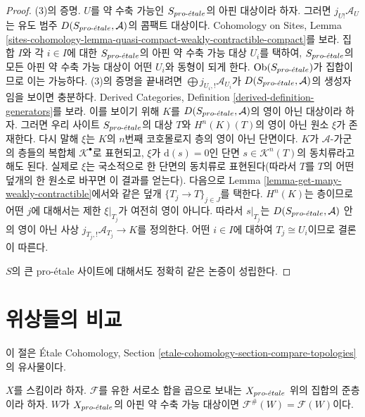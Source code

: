 \begin{proof}
(3)의 증명. $U$를 약 수축 가능인 $S_{pro\text{-}\acute{e}tale}$의 아핀 대상이라 하자.
그러면 $j_{U!}\mathcal{A}_U$는 유도 범주
$D(S_{pro\text{-}\acute{e}tale}, \mathcal{A})$의 콤팩트 대상이다. Cohomology on Sites,
Lemma
\ref{sites-cohomology-lemma-quasi-compact-weakly-contractible-compact}를
보라. 집합 $I$와 각 $i \in I$에 대한 $S_{pro\text{-}\acute{e}tale}$의 아핀 약 수축
가능 대상 $U_i$를 택하여, $S_{pro\text{-}\acute{e}tale}$의 모든 아핀 약 수축 가능
대상이 어떤 $U_i$와 동형이 되게 한다. $\mathop{\mathrm{Ob}}\nolimits(S_{pro\text{-}\acute{e}tale})$가 집합이므로
이는 가능하다. (3)의 증명을 끝내려면
$\bigoplus j_{U_i, !}\mathcal{A}_{U_i}$가
$D(S_{pro\text{-}\acute{e}tale}, \mathcal{A})$의 생성자임을 보이면 충분하다.
Derived Categories, Definition \ref{derived-definition-generators}를 보라.
이를 보이기 위해 $K$를 $D(S_{pro\text{-}\acute{e}tale}, \mathcal{A})$의 영이 아닌
대상이라 하자. 그러면 우리 사이트 $S_{pro\text{-}\acute{e}tale}$의 대상 $T$와
$H^n(K)(T)$의 영이 아닌 원소 $\xi$가 존재한다. 다시 말해 $\xi$는
$K$의 $n$번째 코호몰로지 층의 영이 아닌 단면이다.
$K$가 $\mathcal{A}$-가군의 층들의 복합체 $\mathcal{K}^\bullet$로
표현되고, $\xi$가 $\text{d}(s) = 0$인 단면
$s \in \mathcal{K}^n(T)$의 동치류라고 해도 된다. 실제로 $\xi$는
국소적으로 한 단면의 동치류로 표현된다(따라서 $T$를 $T$의 어떤
덮개의 한 원소로 바꾸면 이 결과를 얻는다).
다음으로 Lemma \ref{lemma-get-many-weakly-contractible}에서와 같은
덮개 $\{T_j \to T\}_{j \in J}$를 택한다. $H^n(K)$는 층이므로 어떤
$j$에 대해서는 제한 $\xi|_{T_j}$가 여전히 영이 아니다. 따라서
$s|_{T_j}$는 $D(S_{pro\text{-}\acute{e}tale}, \mathcal{A})$ 안의 영이 아닌 사상
$j_{T_j, !}\mathcal{A}_{T_j} \to K$를 정의한다.
어떤 $i \in I$에 대하여 $T_j \cong U_i$이므로 결론이 따른다.

\medskip\noindent
$S$의 큰 pro-\'etale 사이트에 대해서도 정확히 같은 논증이 성립한다.
\end{proof}






\section{위상들의 비교}
\label{section-compare-topologies}

\noindent
이 절은 \'Etale Cohomology, Section
\ref{etale-cohomology-section-compare-topologies}의 유사물이다.

\begin{lemma}
\label{lemma-presheaf-value-weakly-contractible}
$X$를 스킴이라 하자. $\mathcal{F}$를 유한 서로소 합을 곱으로 보내는
$X_{pro\text{-}\acute{e}tale}$ 위의 집합의 준층이라 하자. $W$가 $X_{pro\text{-}\acute{e}tale}$의 아핀
약 수축 가능 대상이면
$\mathcal{F}^\#(W) = \mathcal{F}(W)$이다.
\end{lemma}

